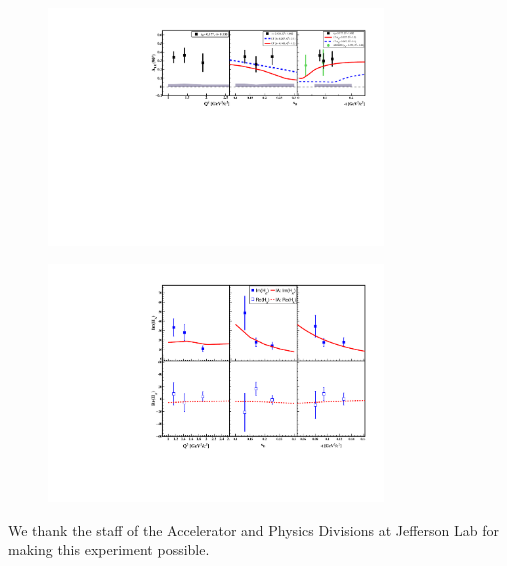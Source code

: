 \documentclass[nofootinbib,twocolumn,showpacs,prl,superscriptaddress,secnumarabic,amssymb,nobibnotes,aps,floatfix]{revtex4}
\begin{document}
\begin{figure}[tb]
\includegraphics[width=8.9cm]{figs/coherent-ALU_90.pdf}
\vspace{-0.9cm}
\caption{}
\label{fig:alu90}
\end{figure}


\begin{figure}[tb]
\includegraphics[width=8.9cm]{figs/updated_CFFs.pdf}
\vspace{-0.9cm}
\caption{}
\label{fig:CFF_HA}
\end{figure}



We thank the staff of the Accelerator and Physics Divisions
at Jefferson Lab for making this experiment possible.
\end{document}
